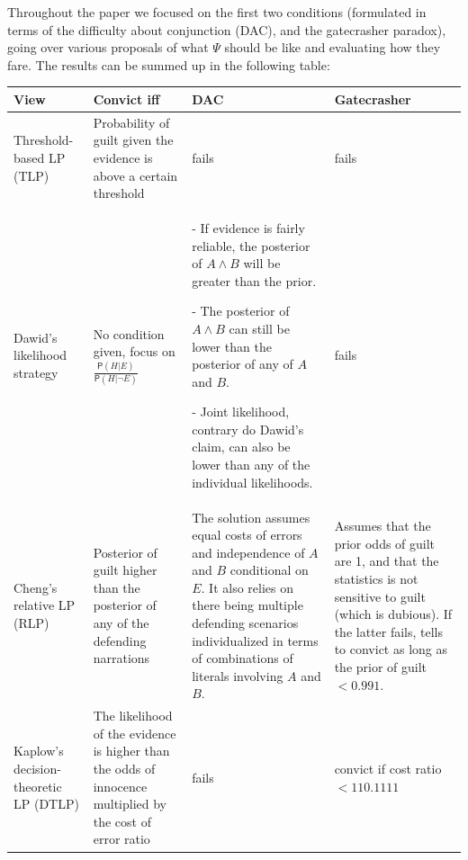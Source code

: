\documentclass[10pt,dvipsnames,enabledeprecatedfontcommands]{scrartcl}
\newcommand{\n}{\neg}
\newcommand{\et}{\wedge}
\newcommand{\pr}[1]{\mathsf{P}(#1)}
\begin{document}
Throughout the paper we focused on the first two conditions (formulated
in terms of the difficulty about conjunction (DAC), and the gatecrasher
paradox), going over various proposals of what \(\Psi\) should be like
and evaluating how they fare. The results can be summed up in the
following table:

\begin{center}
\footnotesize 
 \begin{tabular}{@{}p{3cm}p{2.5cm}p{4cm}p{3cm}@{}}
\toprule
\textbf{View} & \textbf{Convict iff} & \textbf{DAC} & \textbf{Gatecrasher} \\ \midrule
Threshold-based LP (TLP) & Probability of guilt given the evidence is above a certain threshold & fails & fails \\
Dawid's likelihood strategy & No condition given, focus on $\frac{\pr{H\vert E}}{\pr{H\vert \n E}}$ & - If evidence is fairly reliable, the posterior of $A\et B$ will be greater than the prior.

- The posterior of $A\et B$ can still be lower than the posterior of any of $A$ and $B$.

- Joint likelihood, contrary do Dawid's claim, can also be lower than any of the individual likelihoods. & fails  \\
Cheng's relative LP (RLP)
& Posterior of guilt higher than the posterior of any of the defending narrations & The solution assumes equal costs of errors and independence of $A$ and $B$ conditional on $E$. It also relies on there being multiple defending scenarios individualized in terms of  combinations of literals involving $A$ and $B$. & Assumes that the prior odds of guilt are 1, and that the statistics is not sensitive to guilt (which is dubious). If the latter fails, tells to convict as long as the prior of guilt $<0.991$. \\
Kaplow's decision-theoretic LP (DTLP) &
The likelihood of the evidence is higher than the odds of innocence multiplied by the cost of error ratio & fails & convict if cost ratio $<110.1111$
\end{tabular} 
 \end{center}
\end{document}
